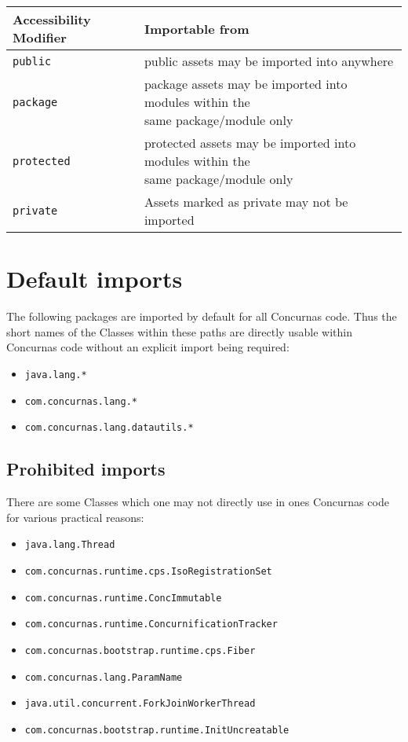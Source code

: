 \documentclass[conc-doc]{subfiles}
\begin{document}
\begin{table}[H]
	\centering
	\begin{tabular}{ll}
		\hline
		Accessibility Modifier&Importable from\\
		\hline
		\lstinline!public!&public assets may be imported into anywhere\\ 
		\lstinline!package!&\bettershortstack{package assets may be imported into modules within the\\same package/module only}\\ 
		\lstinline!protected!&\bettershortstack{protected assets may be imported into modules within the\\same package/module only}\\ 
		\lstinline!private!&Assets marked as private may not be imported\\
		\hline
	\end{tabular}
\end{table}

\section{Default imports}
The following packages are imported by default for all Concurnas code. Thus the short names of the Classes within these paths are directly usable within Concurnas code without an explicit import being required:

\begin{itemize}
	\item \lstinline!java.lang.*!
	\item \lstinline!com.concurnas.lang.*!
	\item \lstinline!com.concurnas.lang.datautils.*!
\end{itemize}


\subsection{Prohibited imports}
There are some Classes which one may not directly use in ones Concurnas code for various practical reasons:
\begin{itemize}
	\item \lstinline!java.lang.Thread!
	\item \lstinline!com.concurnas.runtime.cps.IsoRegistrationSet!
	\item \lstinline!com.concurnas.runtime.ConcImmutable!
	\item \lstinline!com.concurnas.runtime.ConcurnificationTracker!
	\item \lstinline!com.concurnas.bootstrap.runtime.cps.Fiber!
	\item \lstinline!com.concurnas.lang.ParamName!
	\item \lstinline!java.util.concurrent.ForkJoinWorkerThread!
	\item \lstinline!com.concurnas.bootstrap.runtime.InitUncreatable!
\end{itemize}
\end{document}
